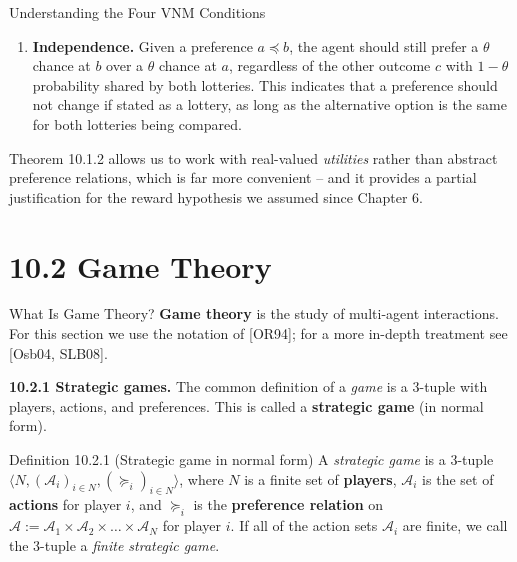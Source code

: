 \documentclass[aspectratio=169,10pt]{beamer}
\newcommand{\Ac}{\mathcal{A}}
\begin{document}
\begin{frame}[allowframebreaks]{Understanding the Four VNM Conditions}
\begin{enumerate}
    \item \textbf{Independence.} Given a preference $a\preceq b$, the
      agent should still prefer a $\theta$ chance at $b$ over a $\theta$
      chance at $a$, regardless of the other outcome $c$ with $1-\theta$
      probability shared by both lotteries. This indicates that a
      preference should not change if stated as a lottery, as long as the
      alternative option is the same for both lotteries being compared.
  \end{enumerate}

  \vspace{0.3em}
  Theorem 10.1.2 allows us to work with real-valued \emph{utilities}
  rather than abstract preference relations, which is far more convenient
  -- and it provides a partial justification for the reward hypothesis we
  assumed since Chapter 6.
\end{frame}

\section{10.2 Game Theory}

\begin{frame}{What Is Game Theory?}
  \textbf{Game theory} is the study of multi-agent interactions. For this
  section we use the notation of {\footnotesize[OR94]}; for a more
  in-depth treatment see {\footnotesize[Osb04, SLB08]}.

  \vspace{0.4em}
  \textbf{10.2.1 Strategic games.} The common definition of a \emph{game}
  is a 3-tuple with players, actions, and preferences. This is called a
  \textbf{strategic game} (in normal form).

  \begin{block}{Definition 10.2.1 (Strategic game in normal form)}
    A \emph{strategic game} is a 3-tuple
    $\langle N,(\Ac_i)_{i\in N},(\succeq_i)_{i\in N}\rangle$, where $N$ is
    a finite set of \textbf{players}, $\Ac_i$ is the set of
    \textbf{actions} for player $i$, and $\succeq_i$ is the
    \textbf{preference relation} on $\Ac:=\Ac_1\times\Ac_2\times\ldots
    \times\Ac_N$ for player $i$. If all of the action sets $\Ac_i$ are
    finite, we call the 3-tuple a \emph{finite strategic game}.
  \end{block}
\end{frame}
\end{document}
